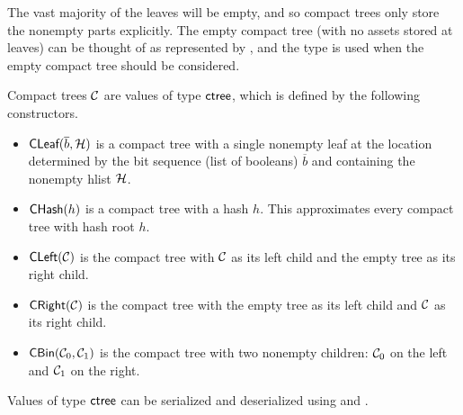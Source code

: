 The vast majority of the leaves will be empty, and so compact trees
only store the nonempty parts explicitly.
The empty compact tree (with no assets stored at leaves) can be thought of as
represented by {}, and the type {}
is used when the empty compact tree should be considered.

Compact trees $\mathcal{C}$ are values of type ${\type{ctree}}$, which is defined by the following constructors.
\begin{itemize}
\item ${\constr{CLeaf}}(\overline{b},\cH)$ is a compact tree with a single nonempty leaf
at the location determined by the bit sequence (list of booleans) $\overline{b}$
and containing the nonempty hlist $\mathcal{H}$.
\item ${\constr{CHash}}(h)$ is a compact tree with a hash $h$. This approximates every compact tree with hash root $h$.
\item ${\constr{CLeft}}(\cC)$ is the compact tree with $\mathcal{C}$ as its left child and the empty tree as its right child.
\item ${\constr{CRight}}(\cC)$ is the compact tree with the empty tree as its left child and $\mathcal{C}$ as its right child.
\item ${\constr{CBin}}(\cC_0,\cC_1)$ is the compact tree with two nonempty children: $\mathcal{C}_0$ on the left and $\mathcal{C}_1$ on the right.
\end{itemize}
Values of type ${\type{ctree}}$ can be serialized and deserialized using
{}
and
{}.

